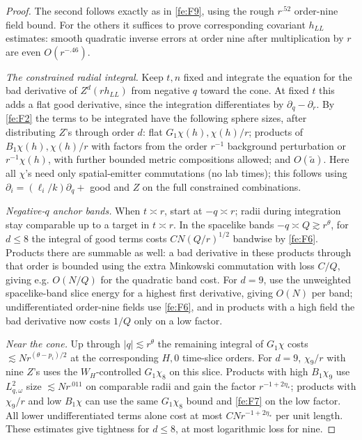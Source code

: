 \begin{proof}
The second follows exactly as in \eqref{fe:F9}, using the rough \(r^{.52}\) order-nine field bound. For the others it suffices to prove corresponding covariant \(h_{LL}\) estimates: smooth quadratic inverse errors at order nine after multiplication by \(r\) are even \(O(r^{-.46})\).

\smallskip\noindent\emph{The constrained radial integral.}
Keep \(t,n\) fixed and integrate the equation for the bad derivative of \(Z^d(r h_{LL})\) from negative \(q\) toward the cone. At fixed \(t\) this adds a flat good derivative, since the integration differentiates by \(\partial_q-\partial_r\). By \eqref{fe:F2} the terms to be integrated have the following sphere sizes, after distributing \(Z\)'s through order \(d\): flat \(G_1\chi(h),\chi(h)/r\); products of \(B_1\chi(h),\chi(h)/r\) with factors from the order \(r^{-1}\) background perturbation or \(r^{-1}\chi(h)\), with further bounded metric compositions allowed; and \(O(\widetilde a)\). Here all \(\chi\)'s need only spatial-emitter commutations (no lab times); this follows using \(\partial_i=(\ell_i/k)\partial_q+\) good and \(Z\) on the full constrained combinations. 

\emph{Negative-$q$ anchor bands.}
When \(t\asymp r\), start at \(-q\asymp r\); radii during integration stay comparable up to a target in \(t\asymp r\). In the spacelike bands \(-q\asymp Q\gtrsim r^\theta\), for \(d\le8\) the integral of good terms costs \(CN (Q/r)^{1/2}\) bandwise by \eqref{fe:F6}. Products there are summable as well: a bad derivative in these products through that order is bounded using the extra Minkowski commutation with loss \(C/Q\), giving e.g. \(O(N/Q)\) for the quadratic band cost. 
For \(d=9\), use the unweighted spacelike-band slice energy for a highest first derivative, giving \(O(N)\) per band; undifferentiated order-nine fields use \eqref{fe:F6}, and in products with a high field the bad derivative now costs \(1/Q\) only on a low factor. 

\emph{Near the cone.}
Up through \(|q|\lesssim r^\theta\) the remaining integral of \(G_1\chi\) costs \(\lesssim N r^{(\theta-p_i)/2}\) at the corresponding \(H,0\) time-slice orders. For \(d=9\), \(\chi_9/r\) with nine \(Z\)'s uses the \(W_H\)-controlled \(G_1\chi_8\) on this slice. Products with high \(B_1\chi_9\) use \(L^2_{q,\omega}\) size \(\lesssim N r^{.011}\) on comparable radii and gain the factor \(r^{-1+2\eta_*}\); products with \(\chi_9/r\) and low \(B_1\chi\) can use the same \(G_1\chi_8\) bound and \eqref{fe:F7} on the low factor. All lower undifferentiated terms alone cost at most \(CN r^{-1+2\eta_*}\) per unit length. These estimates give tightness for \(d\le8\), at most logarithmic loss for nine. 


\end{proof}
